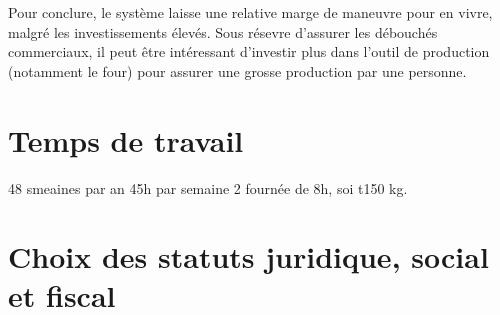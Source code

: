 \documentclass{book}
\begin{document}
Pour conclure, le système laisse une relative marge de maneuvre pour en vivre, malgré les investissements élevés. Sous résevre d'assurer les débouchés commerciaux, il peut être intéressant d'investir plus dans l'outil de production (notamment le four) pour assurer une grosse production par une personne.  

\section{Temps de travail}
\label{part:tps_travail}

48 smeaines par an
45h par semaine
2 fournée de 8h, soi t150 kg.

\section{Choix des statuts juridique, social et fiscal}
\end{document}
